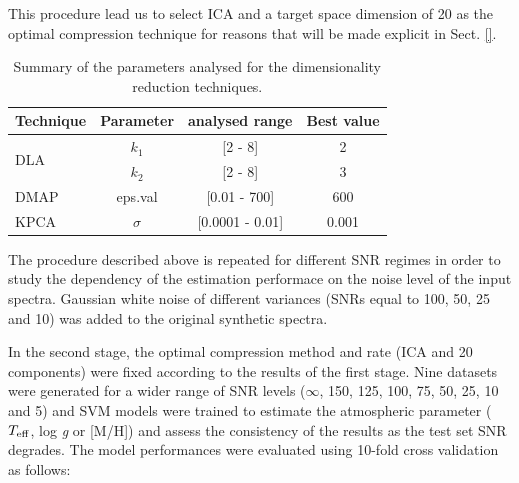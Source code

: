 \documentclass[a4paper,fleqn,usenatbib]{mnras}
\begin{document}
{{{This procedure lead us to select ICA and a target space dimension of
20 as the optimal compression technique for reasons that will be made
explicit in Sect. \ref{}. 

\begin{table}
\centering
\caption{Summary of the parameters analysed for the 
dimensionality reduction techniques.}
\label{tab:parameters}
\begin{tabular}{l c c c}
\hline
\textbf{Technique} & \textbf{Parameter} & \textbf{analysed range} & \textbf{Best value} \\
\hline
\multirow{2}{*}{DLA} 
	& $k_1$ & [2 - 8]  & 2 \\\cline{2-4}
	& $k_2$ & [2 - 8]  & 3 \\\hline
DMAP & eps.val & [0.01 - 700] & 600 \\\hline
KPCA & $\sigma$ & [0.0001 - 0.01] & 0.001 \\
\hline
\end{tabular}
\end{table}

The procedure described above is repeated for different SNR regimes in
order to study the dependency of the estimation performace on the
noise level of the input spectra. Gaussian white noise of different
variances (SNRs equal to 100, 50, 25 and 10) was added to the original
synthetic spectra. 

In the second stage, the optimal compression method and rate (ICA and
20 components) were fixed according to the results of the first
stage. Nine datasets were generated for a wider range of SNR levels
($\infty$, 150, 125, 100, 75, 50, 25, 10 and 5) and SVM models were
trained to estimate the atmospheric parameter ($T_{\rm eff}$, log
\textit{g} or [M/H]) and assess the consistency of the results as the
test set SNR degrades. The model performances were evaluated using
10-fold cross validation as follows:

}}}
\end{document}
